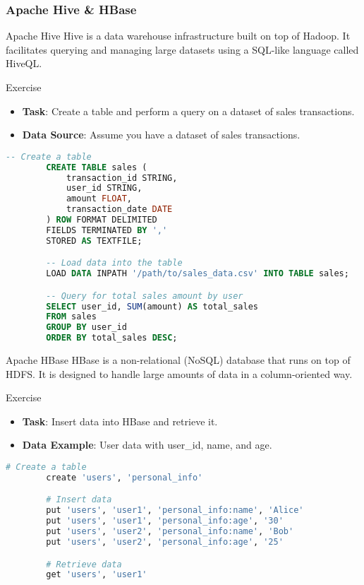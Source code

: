 \documentclass[aspectratio=169]{beamer}
\begin{document}
\begin{frame}[fragile]
    \frametitle{Apache Hive \& HBase}
    \begin{block}{Apache Hive}
        Hive is a data warehouse infrastructure built on top of Hadoop. It facilitates querying and managing large datasets using a SQL-like language called HiveQL.
    \end{block}

    \begin{block}{Exercise}
        \begin{itemize}
            \item \textbf{Task}: Create a table and perform a query on a dataset of sales transactions.
            \item \textbf{Data Source}: Assume you have a dataset of sales transactions.
        \end{itemize}
    \end{block}

    \begin{lstlisting}[language=SQL]
        -- Create a table
        CREATE TABLE sales (
            transaction_id STRING,
            user_id STRING,
            amount FLOAT,
            transaction_date DATE
        ) ROW FORMAT DELIMITED 
        FIELDS TERMINATED BY ',' 
        STORED AS TEXTFILE;

        -- Load data into the table
        LOAD DATA INPATH '/path/to/sales_data.csv' INTO TABLE sales;

        -- Query for total sales amount by user
        SELECT user_id, SUM(amount) AS total_sales 
        FROM sales 
        GROUP BY user_id 
        ORDER BY total_sales DESC;
    \end{lstlisting}

    \begin{block}{Apache HBase}
        HBase is a non-relational (NoSQL) database that runs on top of HDFS. It is designed to handle large amounts of data in a column-oriented way.
    \end{block}

    \begin{block}{Exercise}
        \begin{itemize}
            \item \textbf{Task}: Insert data into HBase and retrieve it.
            \item \textbf{Data Example}: User data with user\_id, name, and age.
        \end{itemize}
    \end{block}

    \begin{lstlisting}[language=bash]
        # Create a table
        create 'users', 'personal_info'

        # Insert data
        put 'users', 'user1', 'personal_info:name', 'Alice'
        put 'users', 'user1', 'personal_info:age', '30'
        put 'users', 'user2', 'personal_info:name', 'Bob'
        put 'users', 'user2', 'personal_info:age', '25'

        # Retrieve data
        get 'users', 'user1'
    \end{lstlisting}
\end{frame}
\end{document}
